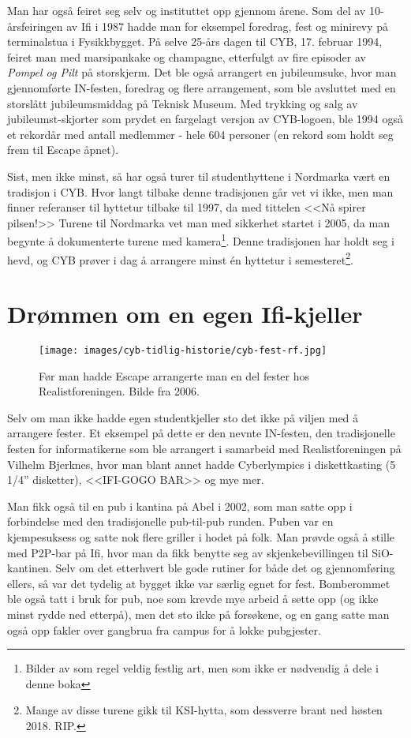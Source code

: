 Man har også feiret seg selv og instituttet opp gjennom årene. Som del av 10-årsfeiringen av Ifi i 1987 hadde man for eksempel foredrag, fest og minirevy på terminalstua i Fysikkbygget. På selve 25-års dagen til CYB, 17. februar 1994, feiret man med marsipankake og champagne, etterfulgt av fire episoder av \textit{Pompel og Pilt} på storskjerm. Det ble også arrangert en jubileumsuke, hvor man gjennomførte IN-festen, foredrag og flere arrangement, som ble avsluttet med en storslått jubileumsmiddag på Teknisk Museum. Med trykking og salg av jubileumst-skjorter som prydet en fargelagt versjon av CYB-logoen, ble 1994 også et rekordår med antall medlemmer - hele 604 personer (en rekord som holdt seg frem til Escape åpnet).

Sist, men ikke minst, så har også turer til studenthyttene i Nordmarka vært en tradisjon i CYB. Hvor langt tilbake denne tradisjonen går vet vi ikke, men man finner referanser til hyttetur tilbake til 1997, da med tittelen <<Nå spirer pilsen!>> Turene til Nordmarka vet man med sikkerhet startet i 2005, da man begynte å dokumenterte turene med kamera\footnote{Bilder av som regel veldig festlig art, men som ikke er nødvendig å dele i denne boka}. Denne tradisjonen har holdt seg i hevd, og CYB prøver i dag å arrangere minst én hyttetur i semesteret\footnote{Mange av disse turene gikk til KSI-hytta, som dessverre brant ned høsten 2018. RIP.}.

\section{Drømmen om en egen Ifi-kjeller}

\begin{wrapfigure}{r}{7cm}
	\vspace{-20pt}
	\centering
	\texttt{[image: images/cyb-tidlig-historie/cyb-fest-rf.jpg]}
	\caption{Før man hadde Escape arrangerte man en del fester hos Realistforeningen. Bilde fra 2006.}
\end{wrapfigure}

Selv om man ikke hadde egen studentkjeller sto det ikke på viljen med å arrangere fester. Et eksempel på dette er den nevnte IN-festen, den tradisjonelle festen for informatikerne som ble arrangert i samarbeid med Realistforeningen på Vilhelm Bjerknes, hvor man blant annet hadde Cyberlympics i diskettkasting (5 1/4'' disketter), <<IFI-GOGO BAR>> og mye mer.

Man fikk også til en pub i kantina på Abel i 2002, som man satte opp i forbindelse med den tradisjonelle pub-til-pub runden. Puben var en kjempesuksess og satte nok flere griller i hodet på folk. Man prøvde også å stille med P2P-bar på Ifi, hvor man da fikk benytte seg av skjenkebevillingen til SiO-kantinen. Selv om det etterhvert ble gode rutiner for både det og gjennomføring ellers, så var det tydelig at bygget ikke var særlig egnet for fest. Bomberommet ble også tatt i bruk for pub, noe som krevde mye arbeid å sette opp (og ikke minst rydde ned etterpå), men det sto ikke på forsøkene, og en gang satte man også opp fakler over gangbrua fra campus for å lokke pubgjester.

